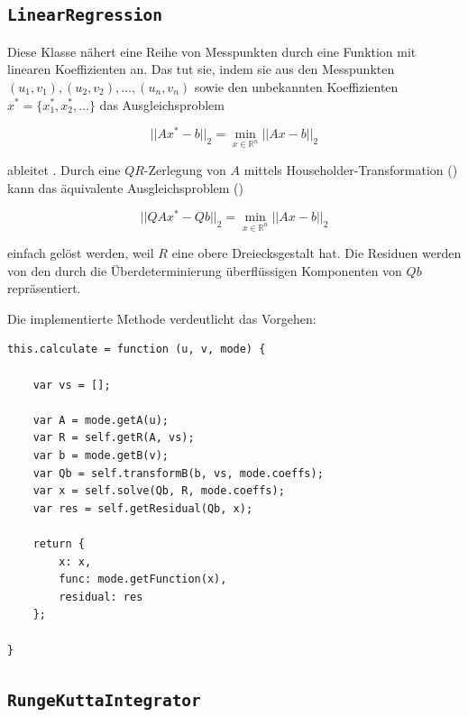 \documentclass[11pt]{scrreprt} %
\theoremstyle{definition}
\begin{document}
\subsection{{\tt LinearRegression}}

Diese Klasse nähert eine Reihe von Messpunkten durch eine Funktion mit linearen Koeffizienten an. Das tut sie, indem sie aus den Messpunkten $(u_1, v_1), (u_2, v_2), \dots, (u_n, v_n)$ sowie den unbekannten Koeffizienten $x^* = \{x^*_1, x^*_2, \dots\}$ das Ausgleichsproblem

\[
||Ax^* - b||_2 = \min_{x \in \mathbb{R}^n} ||Ax - b||_2
\]

%

ableitet \cite{massjung}. Durch eine $QR$-Zerlegung von $A$ mittels Householder-Transformation (\cite{wiki:householder}) kann das äquivalente Ausgleichsproblem (\cite{wiki:lineareRegression})

\[
||QAx^* - Qb||_2 = \min_{x \in \mathbb{R}^n} ||Ax - b||_2
\]

einfach gelöst werden, weil $R$ eine obere Dreiecksgestalt hat. Die Residuen werden von den durch die Überdeterminierung überflüssigen Komponenten von $Qb$ repräsentiert.

Die implementierte Methode verdeutlicht das Vorgehen:

\begin{lstlisting}
this.calculate = function (u, v, mode) {
	
	var vs = [];
		
	var A = mode.getA(u);
	var R = self.getR(A, vs);
	var b = mode.getB(v);
	var Qb = self.transformB(b, vs, mode.coeffs);
	var x = self.solve(Qb, R, mode.coeffs);
	var res = self.getResidual(Qb, x);
				
	return {
		x: x,
		func: mode.getFunction(x),
		residual: res
	};
		
}
\end{lstlisting}

\subsection{{\tt RungeKuttaIntegrator}}
\end{document}
